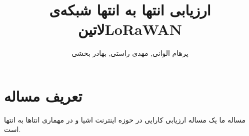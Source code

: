 \documentclass{IEEEtran}
\title{ارزیابی انتها به انتها شبکه‌ی \متن‌لاتین{LoRaWAN}}
\author{پرهام الوانی, مهدی راستی, بهادر بخشی}
\begin{document}
\maketitle

\section{تعریف مساله}

مساله ما یک مساله ارزیابی کارایی در حوزه اینترنت اشیا و در مهماری انتاها به انتها است.
\end{document}
